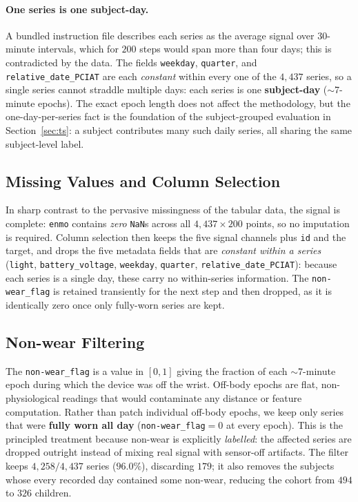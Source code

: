 \paragraph{One series is one subject-day.} A bundled instruction file describes each series as the average signal over $30$-minute intervals, which for $200$ steps would span more than four days; this is contradicted by the data. The fields \texttt{weekday}, \texttt{quarter}, and \texttt{relative\_date\_PCIAT} are each \emph{constant} within every one of the $4{,}437$ series, so a single series cannot straddle multiple days: each series is one \textbf{subject-day} ($\sim$7-minute epochs). The exact epoch length does not affect the methodology, but the one-day-per-series fact is the foundation of the subject-grouped evaluation in Section~\ref{sec:ts}: a subject contributes many such daily series, all sharing the same subject-level label.

\subsection{Missing Values and Column Selection}
In sharp contrast to the pervasive missingness of the tabular data, the signal is complete: \texttt{enmo} contains \emph{zero} \texttt{NaN}s across all $4{,}437\times200$ points, so no imputation is required. Column selection then keeps the five signal channels plus \texttt{id} and the target, and drops the five metadata fields that are \emph{constant within a series} (\texttt{light}, \texttt{battery\_voltage}, \texttt{weekday}, \texttt{quarter}, \texttt{relative\_date\_PCIAT}): because each series is a single day, these carry no within-series information. The \texttt{non-wear\_flag} is retained transiently for the next step and then dropped, as it is identically zero once only fully-worn series are kept.

\subsection{Non-wear Filtering}
The \texttt{non-wear\_flag} is a value in $[0,1]$ giving the fraction of each $\sim$7-minute epoch during which the device was off the wrist. Off-body epochs are flat, non-physiological readings that would contaminate any distance or feature computation. Rather than patch individual off-body epochs, we keep only series that were \textbf{fully worn all day} (\texttt{non-wear\_flag}$=0$ at every epoch). This is the principled treatment because non-wear is explicitly \emph{labelled}: the affected series are dropped outright instead of mixing real signal with sensor-off artifacts. The filter keeps $4{,}258/4{,}437$ series ($96.0\%$), discarding $179$; it also removes the subjects whose every recorded day contained some non-wear, reducing the cohort from $494$ to $326$ children.

